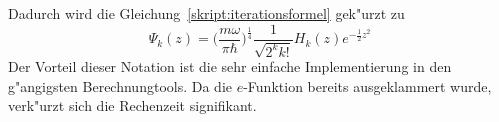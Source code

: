 \begin{refsection}
\[\]
Dadurch wird die Gleichung~\ref{skript:iterationsformel} gek"urzt zu
\begin{equation}
\Psi_k(z)
=
\biggl(\frac{m\omega}{\pi\hbar}\biggr)^\frac14
\frac1{\sqrt{2^k k!}}H_k(z)
e^{-\frac12 z^2}
\end{equation}
Der Vorteil dieser Notation ist die sehr einfache Implementierung
in den g"angigsten Berechnungtools.
Da die $e$-Funktion bereits ausgeklammert wurde, verk"urzt sich die Rechenzeit
signifikant.


\end{refsection}
